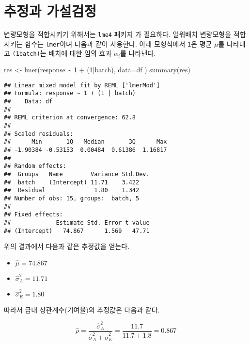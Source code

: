 \documentclass[
]{book}
\newenvironment{Shaded}{\begin{snugshade}}{\end{snugshade}}
\newcommand{\AttributeTok}[1]{\textcolor[rgb]{0.77,0.63,0.00}{#1}}
\newcommand{\DecValTok}[1]{\textcolor[rgb]{0.00,0.00,0.81}{#1}}
\newcommand{\FunctionTok}[1]{\textcolor[rgb]{0.00,0.00,0.00}{#1}}
\newcommand{\NormalTok}[1]{#1}
\newcommand{\OtherTok}[1]{\textcolor[rgb]{0.56,0.35,0.01}{#1}}
\newcommand{\SpecialCharTok}[1]{\textcolor[rgb]{0.00,0.00,0.00}{#1}}
\providecommand{\tightlist}{%
  \setlength{\itemsep}{0pt}\setlength{\parskip}{0pt}}
\theoremstyle{definition}
\theoremstyle{definition}
\theoremstyle{definition}
\theoremstyle{remark}
\begin{document}
\hypertarget{uxcd94uxc815uxacfc-uxac00uxc124uxac80uxc815}{%
\section{추정과 가설검정}\label{uxcd94uxc815uxacfc-uxac00uxc124uxac80uxc815}}

변량모형을 적합시키기 위해서는 \texttt{lme4} 패키지 가 필요하다. 일워배치 변량모형을 적합시키는 함수는
\texttt{lmer}이며 다음과 같이 사용한다. 아래 모형식에서 \texttt{1}은 평균 \(\mu\)를 나타내고 \texttt{(1\textbar{}batch)}는 배치에 대한 임의 효과 \(\alpha_i\)를 나타낸다.

\begin{Shaded}
\begin{Highlighting}[]
\NormalTok{res }\OtherTok{\textless{}{-}} \FunctionTok{lmer}\NormalTok{(response }\SpecialCharTok{\textasciitilde{}} \DecValTok{1} \SpecialCharTok{+}\NormalTok{ (}\DecValTok{1}\SpecialCharTok{|}\NormalTok{batch), }\AttributeTok{data=}\NormalTok{df ) }
\FunctionTok{summary}\NormalTok{(res)}
\end{Highlighting}
\end{Shaded}

\begin{verbatim}
## Linear mixed model fit by REML ['lmerMod']
## Formula: response ~ 1 + (1 | batch)
##    Data: df
## 
## REML criterion at convergence: 62.8
## 
## Scaled residuals: 
##      Min       1Q   Median       3Q      Max 
## -1.90384 -0.53153  0.00484  0.61386  1.16817 
## 
## Random effects:
##  Groups   Name        Variance Std.Dev.
##  batch    (Intercept) 11.71    3.422   
##  Residual              1.80    1.342   
## Number of obs: 15, groups:  batch, 5
## 
## Fixed effects:
##             Estimate Std. Error t value
## (Intercept)   74.867      1.569   47.71
\end{verbatim}

위의 결과에서 다음과 같은 추정값을 얻는다.

\begin{itemize}
\tightlist
\item
  \(\hat \mu = 74.867\)
\item
  \(\hat \sigma^2_A = 11.71\)
\item
  \(\hat \sigma_E^2 = 1.80\)
\end{itemize}

따라서 급내 상관계수(기여율)의 추정값은 다음과 같다.

\[ \hat \rho = \frac{\hat \sigma^2_A }{\hat \sigma^2_A + \hat \sigma^2_E }
= \frac{11.7}{11.7 + 1.8} = 0.867 \]
\end{document}
